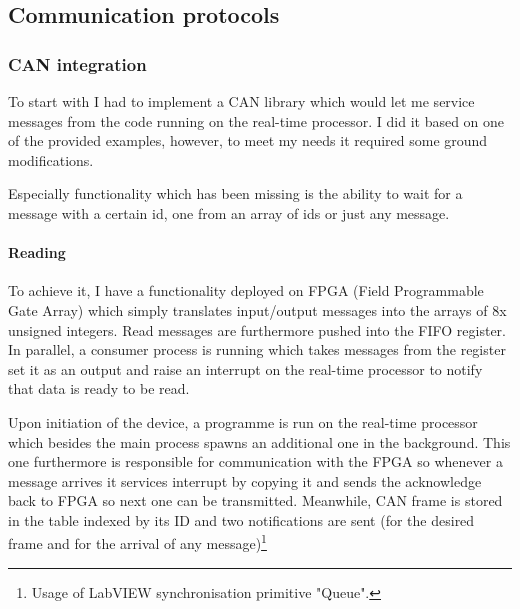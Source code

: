 \subsection{Communication protocols}

\subsubsection{CAN integration}
To start with I had to implement a CAN library which would let me service messages from the code running on the real-time processor. I did it based on one of the provided examples, however, to meet my needs it required some ground modifications.

Especially functionality which has been missing is the ability to wait for a message with a certain id, one from an array of ids or just any message. 
\paragraph{Reading}

To achieve it, I have a functionality deployed on FPGA (Field Programmable Gate Array) which simply translates input/output messages into the arrays of 8x unsigned integers. Read messages are furthermore pushed into the FIFO register. In parallel, a consumer process is running which takes messages from the register set it as an output and raise an interrupt on the real-time processor to notify that data is ready to be read.

Upon initiation of the device, a programme is run on the real-time processor which besides the main process spawns an additional one in the background. This one furthermore is responsible for communication with the FPGA so whenever a message arrives it services interrupt by copying it and sends the acknowledge back to FPGA so next one can be transmitted. Meanwhile, CAN frame is stored in the table indexed by its ID and two notifications are sent (for the desired frame and for the arrival of any message)\footnote{Usage of LabVIEW synchronisation primitive "Queue".}%

